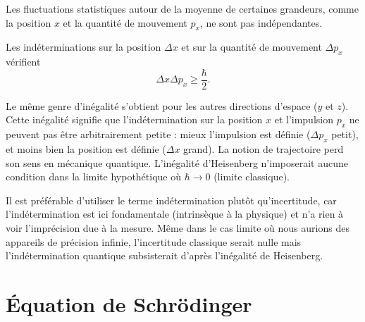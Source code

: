 \documentclass[12pt,fancy]{cours}
\begin{document}
Les fluctuations statistiques autour de la moyenne de certaines grandeurs, comme la position $x$ et la quantité de mouvement $p_x$, ne sont pas indépendantes. 
\begin{theorem}\label{form:}
  Les indéterminations sur la position $\Delta x$ et sur la quantité de mouvement $\Delta p_x$ vérifient
  $$
  \Delta x \Delta p_x \geq \frac{\hbar}{2}.
  \label{eqn:indetermination}
  $$
\end{theorem}
Le même genre d'inégalité s'obtient pour les autres directions d'espace ($y$ et $z$). Cette inégalité signifie que l'indétermination sur la position $x$ et l'impulsion $p_x$ ne peuvent pas être arbitrairement petite : mieux l'impulsion est définie ($\Delta p_x$ petit), et moins bien la position est définie ($\Delta x$ grand). La notion de trajectoire perd son sens en mécanique quantique. L'inégalité d'Heisenberg n'imposerait aucune condition dans la limite hypothétique où $\hbar\to 0$ (limite classique).

\begin{remarque}
Il est préférable d'utiliser le terme indétermination plutôt qu'incertitude, car l'indétermination est ici fondamentale (intrinsèque à la physique) et n'a rien à voir l'imprécision due à la mesure. Même dans le cas limite où nous aurions des appareils de précision infinie, l'incertitude classique serait nulle mais l'indétermination quantique subsisterait d'après l'inégalité de Heisenberg.
\end{remarque}

\section{Équation de Schrödinger}
\end{document}
